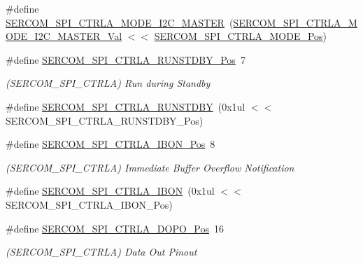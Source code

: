 \begin{DoxyCompactItemize}
\item 
\#define \mbox{\hyperlink{group___s_a_m_d21___s_e_r_c_o_m_ga7c862019371bc3863d7c27b7984918e4}{S\+E\+R\+C\+O\+M\+\_\+\+S\+P\+I\+\_\+\+C\+T\+R\+L\+A\+\_\+\+M\+O\+D\+E\+\_\+\+I2\+C\+\_\+\+M\+A\+S\+T\+ER}}~(\mbox{\hyperlink{group___s_a_m_d21___s_e_r_c_o_m_ga6d57f57642ee3da215047ba3efe9891f}{S\+E\+R\+C\+O\+M\+\_\+\+S\+P\+I\+\_\+\+C\+T\+R\+L\+A\+\_\+\+M\+O\+D\+E\+\_\+\+I2\+C\+\_\+\+M\+A\+S\+T\+E\+R\+\_\+\+Val}} $<$$<$ \mbox{\hyperlink{group___s_a_m_d21___s_e_r_c_o_m_ga52c079d744ef9c07762c97548eea6c8d}{S\+E\+R\+C\+O\+M\+\_\+\+S\+P\+I\+\_\+\+C\+T\+R\+L\+A\+\_\+\+M\+O\+D\+E\+\_\+\+Pos}})
\item 
\#define \mbox{\hyperlink{group___s_a_m_d21___s_e_r_c_o_m_ga7f2cfd4cf26f7728332a1133feb4d0b1}{S\+E\+R\+C\+O\+M\+\_\+\+S\+P\+I\+\_\+\+C\+T\+R\+L\+A\+\_\+\+R\+U\+N\+S\+T\+D\+B\+Y\+\_\+\+Pos}}~7
\begin{DoxyCompactList}\small\item\em (S\+E\+R\+C\+O\+M\+\_\+\+S\+P\+I\+\_\+\+C\+T\+R\+LA) Run during Standby \end{DoxyCompactList}\item 
\#define \mbox{\hyperlink{group___s_a_m_d21___s_e_r_c_o_m_ga3d66b0ce85e2a6d4f1ae4b88f191f60f}{S\+E\+R\+C\+O\+M\+\_\+\+S\+P\+I\+\_\+\+C\+T\+R\+L\+A\+\_\+\+R\+U\+N\+S\+T\+D\+BY}}~(0x1ul $<$$<$ S\+E\+R\+C\+O\+M\+\_\+\+S\+P\+I\+\_\+\+C\+T\+R\+L\+A\+\_\+\+R\+U\+N\+S\+T\+D\+B\+Y\+\_\+\+Pos)
\item 
\#define \mbox{\hyperlink{group___s_a_m_d21___s_e_r_c_o_m_ga63758f686d06f8346066be4217a78f17}{S\+E\+R\+C\+O\+M\+\_\+\+S\+P\+I\+\_\+\+C\+T\+R\+L\+A\+\_\+\+I\+B\+O\+N\+\_\+\+Pos}}~8
\begin{DoxyCompactList}\small\item\em (S\+E\+R\+C\+O\+M\+\_\+\+S\+P\+I\+\_\+\+C\+T\+R\+LA) Immediate Buffer Overflow Notification \end{DoxyCompactList}\item 
\#define \mbox{\hyperlink{group___s_a_m_d21___s_e_r_c_o_m_ga0f3977bbd89b404668dc1b9ae35edb22}{S\+E\+R\+C\+O\+M\+\_\+\+S\+P\+I\+\_\+\+C\+T\+R\+L\+A\+\_\+\+I\+B\+ON}}~(0x1ul $<$$<$ S\+E\+R\+C\+O\+M\+\_\+\+S\+P\+I\+\_\+\+C\+T\+R\+L\+A\+\_\+\+I\+B\+O\+N\+\_\+\+Pos)
\item 
\#define \mbox{\hyperlink{group___s_a_m_d21___s_e_r_c_o_m_gaa72c7504628951c39d9877c33ab9e6fe}{S\+E\+R\+C\+O\+M\+\_\+\+S\+P\+I\+\_\+\+C\+T\+R\+L\+A\+\_\+\+D\+O\+P\+O\+\_\+\+Pos}}~16
\begin{DoxyCompactList}\small\item\em (S\+E\+R\+C\+O\+M\+\_\+\+S\+P\+I\+\_\+\+C\+T\+R\+LA) Data Out Pinout \end{DoxyCompactList}\item 
$$
\end{DoxyCompactItemize}
